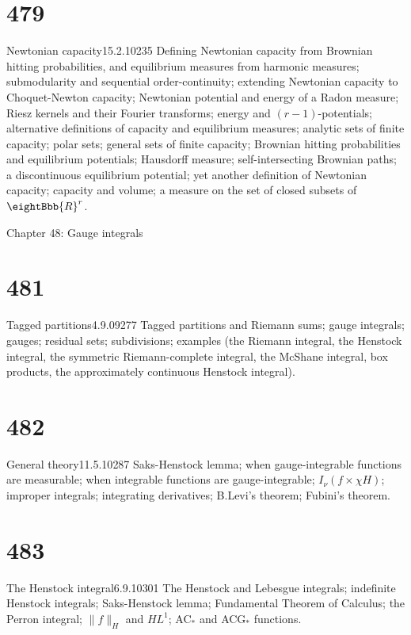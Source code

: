 \section{479}{Newtonian capacity}{15.2.10}{235}{}
{Defining Newtonian capacity from Brownian hitting probabilities, and
equilibrium measures from harmonic measures;  submodularity and
sequential order-continuity;
extending Newtonian capacity to Choquet-Newton capacity;   Newtonian
potential and energy
of a Radon measure;  Riesz kernels and their Fourier transforms;
energy and $(r-1)$-potentials;  alternative definitions of 
capacity and equilibrium measures;  analytic sets of finite capacity;
polar sets;  general sets of finite capacity;
Brownian hitting probabilities and equilibrium potentials;
Hausdorff measure;  self-intersecting Brownian paths;  a discontinuous
equilibrium potential;  yet another definition of Newtonian capacity; 
capacity and volume;  a measure on the set of closed subsets of
$\eightBbb{R}^r$.}



Chapter 48:  Gauge integrals


\section{481}{Tagged partitions}{4.9.09}{277}{}
{Tagged partitions and Riemann sums;  gauge integrals;  gauges;
residual sets;  subdivisions;  examples (the Riemann integral, the
Henstock integral, the symmetric Riemann-complete integral, the McShane
integral, box products, the approximately continuous Henstock
integral).}

\ifdim\pagewidth>467pt\fontdimen3\tenrm=2pt\fi

\section{482}{General theory}{11.5.10}{287}{}
{Saks-Henstock lemma;  when gauge-{\vthsp}integrable functions are 
measurable;  when integrable functions are gauge-integrable;
$I_{\nu}(f\times{\chi}H)$;  improper integrals;
integrating derivatives;  B.Levi's theorem;  Fubini's theorem.}

\tenrm=1.67pt

\section{483}{The Henstock integral}{6.9.10}{301}{}
{The Henstock and Lebesgue integrals;  indefinite Henstock integrals;
Saks-Henstock lemma;  Fundamental Theorem of Calculus;  the Perron
integral;  $\|f\|_H$ and $HL^1$;  AC$_*$ and ACG$_*$ functions.}

